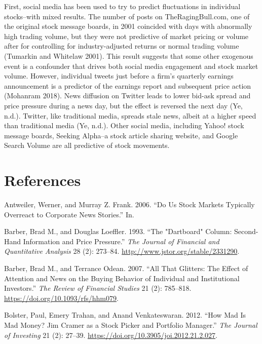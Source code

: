 \documentclass[12pt,]{article}
\begin{document}
First, social media has been used to try to predict fluctuations in
individual stocks--with mixed results. The number of posts on
TheRagingBull.com, one of the original stock message boards, in 2001
coincided with days with abnormally high trading volume, but they were
not predictive of market pricing or volume after for controlling for
industry-adjusted returns or normal trading volume (Tumarkin and
Whitelaw 2001). This result suggests that some other exogenous event is
a confounder that drives both social media engagement and stock market
volume. However, individual tweets just before a firm's quarterly
earnings announcement is a predictor of the earnings report and
subsequent price action (Mohanram 2018). News diffusion on Twitter leads
to lower bid-ask spread and price pressure during a news day, but the
effect is reversed the next day (Ye, n.d.). Twitter, like traditional
media, spreads stale news, albeit at a higher speed than traditional
media (Ye, n.d.). Other social media, including Yahoo! stock message
boards, Seeking Alpha--a stock article sharing website, and Google
Search Volume are all predictive of stock movements.

\hypertarget{references}{%
\section*{References}\label{references}}

\hypertarget{refs}{}
\leavevmode\hypertarget{ref-antweiler2006}{}%
Antweiler, Werner, and Murray Z. Frank. 2006. ``Do Us Stock Markets
Typically Overreact to Corporate News Stories.'' In.

\leavevmode\hypertarget{ref-barber1993}{}%
Barber, Brad M., and Douglas Loeffler. 1993. ``The "Dartboard" Column:
Second-Hand Information and Price Pressure.'' \emph{The Journal of
Financial and Quantitative Analysis} 28 (2): 273--84.
\url{http://www.jstor.org/stable/2331290}.

\leavevmode\hypertarget{ref-barber2007}{}%
Barber, Brad M., and Terrance Odean. 2007. ``All That Glitters: The
Effect of Attention and News on the Buying Behavior of Individual and
Institutional Investors.'' \emph{The Review of Financial Studies} 21
(2): 785--818. \url{https://doi.org/10.1093/rfs/hhm079}.

\leavevmode\hypertarget{ref-bolster2012}{}%
Bolster, Paul, Emery Trahan, and Anand Venkateswaran. 2012. ``How Mad Is
Mad Money? Jim Cramer as a Stock Picker and Portfolio Manager.''
\emph{The Journal of Investing} 21 (2): 27--39.
\url{https://doi.org/10.3905/joi.2012.21.2.027}.
\end{document}
